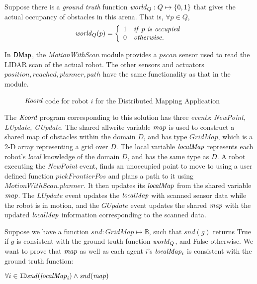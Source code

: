 Suppose there is a \emph{ground truth} function $\mathit{world}_Q : Q \mapsto \left\{0,1\right\}$ that gives the actual occupancy of obstacles in this arena. That is, $\forall p \in Q$,
\begin{align}
\mathit{world}_Q(p) =
		\left\{
		\begin{array}{ll}
			1 & \mathit{if}\ p \ \mathit{is \ occupied}\\
			0 & \mathit{otherwise}.
		\end{array}
		\right.
\end{align}

\newcommand{\MotionWithScan}{\emph{MotionWithScan}\xspace}

In ${\sf DMap}$, the \MotionWithScan module provides a $\mathit{pscan}$ sensor used to read the LIDAR scan of the actual robot. The other sensors and actuators $\mathit{position,reached,planner,path}$ have the same functionality as that in the \Motion module.

\begin{figure}[t]
    {
    
    }
    {
    
    }
    \caption{ $\emph{Koord}$ code for robot $i$ for the Distributed Mapping Application}
    \label{fig:mapapp }
\end{figure}

 The $\emph{Koord}$ program corresponding to this solution has three \emph{events}: \emph{NewPoint, LUpdate, GUpdate}. The shared allwrite variable $\mathit{map}$ is used to construct a shared map of obstacles within the domain $D$, and has type $\mathit{GridMap}$, which is a 2-D array representing a grid over $D$. The local variable $\mathit{localMap}$ represents each robot's \emph{local} knowledge of the domain $D$, and has the same type as $D$. A robot executing the \emph{NewPoint} event, finds an unoccupied point to move to using a user defined function $\mathit{pickFrontierPos}$ and plans a path to it using $\mathit{MotionWithScan.planner}$. It then updates its $\mathit{localMap}$ from the shared variable $\mathit{map}$. The $\mathit{LUpdate}$ event updates the $\mathit{localMap}$ with scanned sensor data while the robot is in motion, and the $\mathit{GUpdate}$ event updates the shared $\mathit{map}$ with the updated $\mathit{localMap}$ information corresponding to the scanned data.


Suppose we have a function $\mathit{snd}: GridMap \mapsto \mathbb{B}$, such that $\mathit{snd}(g)$ returns True if $g$ is consistent with the ground truth function $\mathit{world}_Q$, and False otherwise. We want to prove that $\mathit{map}$ as well as each agent $i$'s $\mathit{localMap}_i$ is consistent with the ground truth function:
\begin{invariant}
    \label{inv:mapping}
    $\forall i \in \texttt{ID} \mathit{snd(\mathit{localMap}_i)} \wedge \mathit{snd(\mathit{map})}$
\end{invariant}


